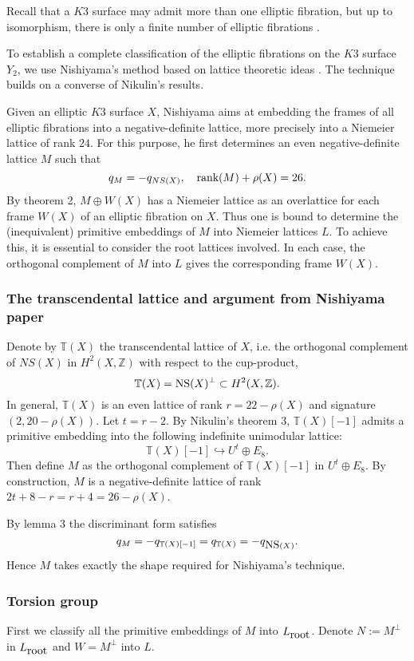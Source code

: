 \documentclass{amsart}
\begin{document}
Recall that a $K3$ surface may admit more than one elliptic fibration, but up to isomorphism, there is only a finite number of elliptic fibrations \cite{St}.

To establish a complete classification of the elliptic fibrations on the $K3$ surface $Y_2$, we use Nishiyama's method based on lattice theoretic ideas \cite{Nis}. The technique builds on a converse of Nikulin's results.

Given an elliptic $K3$ surface $X$, Nishiyama aims at embedding the frames of all elliptic fibrations into a negative-definite lattice, more precisely into a Niemeier lattice of rank $24$. For this purpose, he first determines an even negative-definite lattice $M$ such that
$$q_M=-q_{NS(X)}, \,\,\,\,\,\,\hbox{rank}(M)+\rho(X)=26.$$
By theorem 2, $M\oplus W(X)$ has a Niemeier lattice as an overlattice for each frame $W(X)$ of an elliptic fibration on $X$. Thus one is bound to determine the (inequivalent) primitive embeddings of $M$ into Niemeier lattices $L$. To achieve this, it is essential to consider the root lattices involved. In each case, the orthogonal complement of $M$ into $L$ gives the corresponding frame $W(X)$.

\subsubsection{The transcendental lattice and argument from Nishiyama paper}
Denote by $\mathbb T(X)$ the transcendental lattice of $X$, i.e. the orthogonal complement of $NS(X)$ in $H^2(X,\mathbb Z)$ with respect to the cup-product,
$$\mathbb T(X)=\hbox{NS}(X)^{\perp} \subset H^2(X,\mathbb Z).$$
In general, $\mathbb T(X)$ is an even lattice of rank $r=22-\rho(X)$ and signature $(2,20-\rho(X))$. Let $t=r-2$. By Nikulin's theorem 3, $\mathbb T(X)[-1]$ admits a primitive embedding into the following indefinite unimodular lattice:
$$\mathbb T(X)[-1] \hookrightarrow U^t \oplus E_8.$$
Then define $M$ as the orthogonal complement of $\mathbb T(X)[-1]$ in $ U^t \oplus E_8$. By construction, $M$ is a negative-definite lattice of rank $2t+8-r=r+4=26-\rho(X)$. 

By lemma 3 the discriminant form satisfies
$$q_M=-q_{\mathbb T(X)[-1]}=q_{\mathbb T(X)}=-q_{\hbox{NS}(X)}.$$
Hence $M$ takes exactly the shape required for Nishiyama's technique.


\subsubsection{Torsion group}
First we classify all the primitive embeddings of $M$ into $L_{\hbox{root}}$. Denote $N:=M^{\perp}$ in $L_{\hbox{root}}$ and $W=M^{\perp}$ into $L$.
\end{document}
